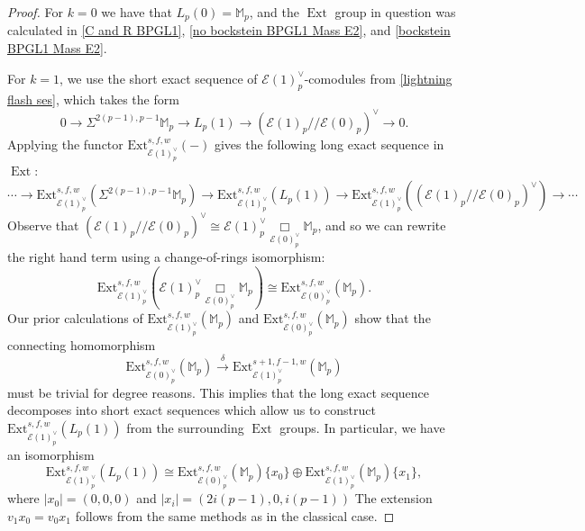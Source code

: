 \documentclass{amsart}
\theoremstyle{plain}
\numberwithin{theorem}{section}
\numberwithin{equation}{section}
\numberwithin{figure}{section}
\DeclareMathOperator{\Ext}{Ext}
\newcommand{\0}{\langle 0 \rangle }
\begin{document}
\begin{proof}
    For $k=0$ we have that $L_p(0) = \mathbb{M}_p$, and the $\Ext$ group in question was calculated in \cref{C and R BPGL1}, \cref{no bockstein BPGL1 Mass E2}, and \cref{bockstein BPGL1 Mass E2}.

    For $k=1$, we use the short exact sequence of $\mathcal{E}(1)^\vee_p$-comodules from \cref{lightning flash ses}, which takes the form
    \[0 \to \Sigma^{2(p-1), p-1}\mathbb{M}_p \to L_p(1) \to  (\mathcal{E}(1)_p // \mathcal{E}(0)_p)^\vee \to 0.\]
    Applying the functor $\text{Ext}^{s,f,w}_{\mathcal{E}(1)^\vee_p}(-)$ gives the following long exact sequence in $\Ext$:
    \[\cdots \to \text{Ext}^{s,f,w}_{\mathcal{E}(1)_p^\vee}(\Sigma^{2(p-1), p-1}\mathbb{M}_p)  \to{\text{Ext}^{s,f,w}_{\mathcal{E}(1)_p^\vee}(L_p(1))} \to {\text{Ext}^{s,f,w}_{\mathcal{E}(1)_p^\vee}((\mathcal{E}(1)_p//\mathcal{E}(0)_p)^\vee)} \to \cdots	\]
    Observe that $(\mathcal{E}(1)_p//\mathcal{E}(0)_p)^\vee \cong \mathcal{E}(1)^\vee_p\underset{\mathcal{E}(0)^\vee_p}{\Box}\mathbb{M}_p$, and so we can rewrite the right hand term using a change-of-rings isomorphism:
    \[\text{Ext}^{s,f,w}_{\mathcal{E}(1)_p^\vee}(\mathcal{E}(1)^\vee_p\underset{\mathcal{E}(0)^\vee_p}{\Box}\mathbb{M}_p) \cong \text{Ext}^{s,f,w}_{\mathcal{E}(0)_p^\vee}(\mathbb{M}_p).\]
    Our prior calculations of $\text{Ext}^{s,f,w}_{\mathcal{E}(1)_p^\vee}(\mathbb{M}_p)$ and $\text{Ext}^{s,f,w}_{\mathcal{E}(0)^\vee_p}(\mathbb{M}_p)$ show that the connecting homomorphism
    \[\text{Ext}^{s,f,w}_{\mathcal{E}(0)_p^\vee}(\mathbb{M}_p) \xrightarrow{\delta} \text{Ext}^{s+1,f-1,w}_{\mathcal{E}(1)_p^\vee}(\mathbb{M}_p)\]
    must be trivial for degree reasons. This implies that the long exact sequence decomposes into short exact sequences which allow us to construct $\text{Ext}^{s,f,w}_{\mathcal{E}(1)_p^\vee}(L_p(1))$ from the surrounding $\Ext$ groups. In particular, we have an isomorphism
    \[\text{Ext}^{s,f,w}_{\mathcal{E}(1)^\vee_p}(L_p(1)) \cong \text{Ext}^{s,f,w}_{\mathcal{E}(0)_p^\vee}(\mathbb{M}_p)\{x_0\} \oplus \text{Ext}^{s,f,w}_{\mathcal{E}(1)_p^\vee}(\mathbb{M}_p)\{x_{1}\},\]
    where $|x_0| = (0,0,0)$ and $|x_i| = \left(2i(p-1), 0, i(p-1)\right)$
    The extension $v_1x_0 = v_0x_1$ follows from the same methods as in the classical case. 


\end{proof}
\end{document}
